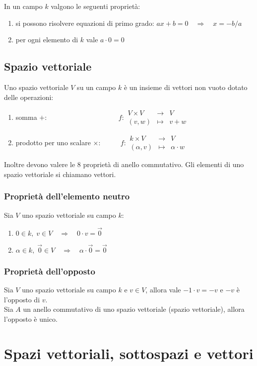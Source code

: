\documentclass[a4paper]{article}
\newcommand\f[4]{\begin{smallmatrix} {#1} &\to &{#2} \\ {#3} &\mapsto &{#4} \end{smallmatrix}}
\begin{document}
In un campo \(k\) valgono le seguenti proprietà:
\begin{enumerate}[topsep=3pt, itemsep=0pt]
	\item si possono risolvere equazioni di primo grado: \(ax + b = 0 \quad \Rightarrow \quad x = -b/a\)
	\item per ogni elemento di \(k\) vale \(a \cdot 0 = 0\)
\end{enumerate}

\subsection{Spazio vettoriale}
Uno spazio vettoriale \(V\) su un campo \(k\) è un insieme di vettori non vuoto dotato delle operazioni:
\begin{enumerate}
	\item somma \(+\): \(\qquad \qquad \qquad \qquad \qquad f : \f{V \times V}{V}{(v, w)}{v + w} \)
	\item prodotto per uno scalare \(\times\): \(\qquad \;\; f : \f{k \times V}{V}{(\alpha, v)}{\alpha \cdot w}\)
\end{enumerate}
Inoltre devono valere le 8 proprietà di anello commutativo.
Gli elementi di uno spazio vettoriale si chiamano vettori.

\subsubsection*{Proprietà dell'elemento neutro}
Sia \(V\) uno spazio vettoriale su campo \(k\):
\begin{enumerate}[topsep=3pt, itemsep=0pt]
	\item \(0 \in k, \; v \in V \quad \Rightarrow \quad 0 \cdot v = \vec{0}\)
	\item \(\alpha \in k, \; \vec{0} \in V \quad \Rightarrow \quad \alpha \cdot \vec{0} = \vec{0}\)
\end{enumerate}

\subsubsection*{Proprietà dell'opposto}
Sia \(V\) uno spazio vettoriale su campo \(k\) e \(v \in V\), allora vale \(-1 \cdot v = -v\) e \(-v\) è l'opposto di \(v\). \\
Sia \(A\) un anello commutativo di uno spazio vettoriale (spazio vettoriale), allora l'opposto è unico.

\newpage


\section{Spazi vettoriali, sottospazi e vettori}
\end{document}
